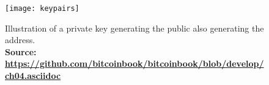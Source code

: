 \begin{figure}[!htbp]
    \centering
    \texttt{[image: keypairs]}
    \caption[Illustration of a private key generating the public also generating the address]
    {Illustration of a private key generating the public also generating the address. \\ \textbf{Source: \url{https://github.com/bitcoinbook/bitcoinbook/blob/develop/ch04.asciidoc}}}
    \label{fig:keypairs}
\end{figure}
    